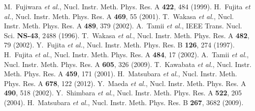 \begin{thebibliography}{99}
 M.~Fujiwara \textit{et al.},
  Nucl. Instr. Meth. Phys. Res. A \textbf{422}, 484 (1999).
 H.~Fujita \textit{et al.},
  Nucl. Instr. Meth. Phys. Res. A \textbf{469}, 55 (2001).
 T.~Wakasa \textit{et al.},
  Nucl. Instr. Meth. Phys. Res. A \textbf{489}, 379 (2002).
 A.~Tamii \textit{et al.}, IEEE
  Trans. Nucl. Sci. \textbf{NS-43}, 2488 (1996).
 T.~Wakasa \textit{et al.},
  Nucl. Instr. Meth. Phys. Res. A \textbf{482}, 79 (2002).
 Y.~Fujita \textit{et al.},
  Nucl. Instr. Meth. Phys. Res. B \textbf{126}, 274 (1997).
 H.~Fujita \textit{et al.},
  Nucl. Instr. Meth. Phys. Res. A \textbf{484}, 17 (2002).
 A.~Tamii \textit{et al.},
  Nucl. Instr. Meth. Phys. Res. A \textbf{605}, 326 (2009).
 T.~Kawabata \textit{et al.},
  Nucl. Instr. Meth. Phys. Res. A \textbf{459}, 171 (2001).
 H.~Matsubara \textit{et al.},
  Nucl. Instr. Meth. Phys. Res. A \textbf{678}, 122 (2012).
 Y.~Maeda \textit{et al.},
  Nucl. Instr. Meth. Phys. Res. A \textbf{490}, 518 (2002).
 Y.~Shimbara \textit{et al.},
  Nucl. Instr. Meth. Phys. Res. A \textbf{522}, 205 (2004).
 H.~Matsubara \textit{et al.},
  Nucl. Instr. Meth. Phys. Res. B \textbf{267}, 3682 (2009).
\end{thebibliography}
